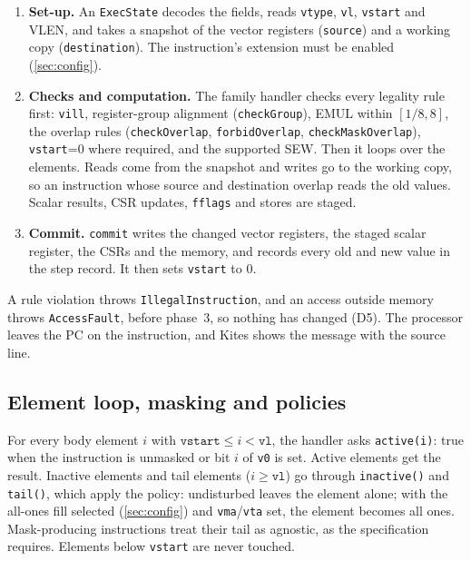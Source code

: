 \documentclass[11pt]{article}
\begin{document}
\begin{enumerate}
\item \textbf{Set-up.} An \texttt{ExecState} decodes the fields, reads \texttt{vtype},
      \texttt{vl}, \texttt{vstart} and VLEN, and takes a snapshot of the vector registers
      (\texttt{source}) and a working copy (\texttt{destination}). The instruction's extension
      must be enabled (\cref{sec:config}).
\item \textbf{Checks and computation.} The family handler checks every legality rule first:
      \texttt{vill}, register-group alignment (\texttt{checkGroup}), EMUL within $[1/8, 8]$,
      the overlap rules (\texttt{checkOverlap}, \texttt{forbidOverlap},
      \texttt{checkMaskOverlap}), \texttt{vstart}=0 where required, and the supported SEW. Then
      it loops over the elements. Reads come from the snapshot and writes go to the working copy,
      so an instruction whose source and destination overlap reads the old values.
      Scalar results, CSR updates, \texttt{fflags} and stores are staged.
\item \textbf{Commit.} \texttt{commit} writes the changed vector registers, the staged scalar
      register, the CSRs and the memory, and records every old and new value in the step
      record. It then sets \texttt{vstart} to 0.
\end{enumerate}

A rule violation throws \texttt{IllegalInstruction}, and an access outside memory throws
\texttt{AccessFault}, before phase~3, so nothing has changed (D5). The processor leaves the PC on
the instruction, and Kites shows the message with the source line.

\subsection{Element loop, masking and policies}

For every body element $i$ with $\texttt{vstart} \le i < \texttt{vl}$, the handler asks
\texttt{active(i)}: true when the instruction is unmasked or bit $i$ of \texttt{v0} is set.
Active elements get the result. Inactive elements and tail elements ($i \ge \texttt{vl}$) go
through \texttt{inactive()} and \texttt{tail()}, which apply the policy: undisturbed
leaves the element alone; with the all-ones fill selected (\cref{sec:config}) and
\texttt{vma}/\texttt{vta} set, the element becomes all ones. Mask-producing instructions treat
their tail as agnostic, as the specification requires. Elements below \texttt{vstart} are never
touched.
\end{document}
